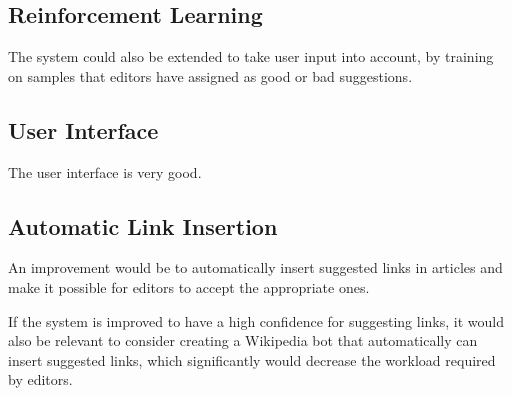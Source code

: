 \subsection{Reinforcement Learning}
The system could also be extended to take user input into account, by training on samples that editors have assigned as good or bad suggestions.

\subsection{User Interface}
The user interface is very good. 

\subsection{Automatic Link Insertion}
An improvement would be to automatically insert suggested links in articles and make it possible for editors to accept the appropriate ones.

If the system is improved to have a high confidence for suggesting links, it would also be relevant to consider creating a Wikipedia bot that automatically can insert suggested links, which significantly would decrease the workload required by editors.

